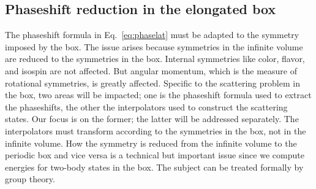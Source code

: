 \documentclass[aps,prd,reprint,showpacs,floatfix,longbibliography,,superscriptaddress]{revtex4-1}
\begin{document}
\begin{widetext}  



\section{Phaseshift reduction in the elongated box }

The phaseshift formula in Eq.~\ref{eq:phaselat} must be adapted to the symmetry imposed by the box. 
The issue arises because symmetries in the infinite volume are reduced to the symmetries in the box. 
Internal symmetries like color, flavor, and isospin are not affected. 
But angular momentum, which is the measure of rotational symmetries, is greatly affected.  
Specific to the scattering problem in the box,  two areas will be impacted; one is the phaseshift formula used to extract the phaseshifts, 
the other the interpolators used to construct the scattering states. Our focus is on the former; the latter will be addressed separately.
The interpolators must transform according to the symmetries in the box, not in the infinite volume. 
How the symmetry is reduced from the infinite volume to the periodic box and vice versa is a technical but important issue 
since we compute energies for two-body states in the box. The subject can be treated formally by group theory.


\end{widetext}
\end{document}
